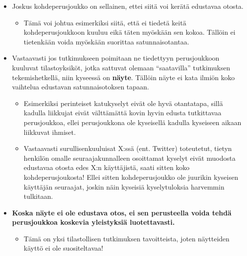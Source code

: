 \documentclass[
]{book}
\providecommand{\tightlist}{%
  \setlength{\itemsep}{0pt}\setlength{\parskip}{0pt}}
\begin{document}
\begin{itemize}
\tightlist
\item
  Joskus kohdeperusjoukko on sellainen, ettei siitä voi kerätä edustavaa otosta.

  \begin{itemize}
  \tightlist
  \item
    Tämä voi johtua esimerkiksi siitä, että ei tiedetä keitä kohdeperusjoukkoon kuuluu eikä täten myöskään sen kokoa. Tällöin ei tietenkään voida myöskään suorittaa satunnaisotantaa.
  \end{itemize}
\item
  Vastaavasti jos tutkimukseen poimitaan ne tiedettyyn perusjoukkoon kuuluvat tilastoyksiköt, jotka sattuvat olemaan ``saatavilla'' tutkimuksen tekemishetkellä, niin kyseessä on \textbf{näyte}. Tällöin näyte ei kata ilmiön koko vaihtelua edustavan satunnaisotoksen tapaan.

  \begin{itemize}
  \tightlist
  \item
    Esimerkiksi perinteiset katukyselyt eivät ole hyvä otantatapa, sillä kadulla liikkujat eivät välttämättä kovin hyvin edusta tutkittavaa perusjoukkoa, ellei perusjoukkona ole kyseisellä kadulla kyseiseen aikaan liikkuvat ihmiset.
  \item
    Vastaavasti surullisenkuuluisat X:ssä (ent. Twitter) toteutetut, tietyn henkilön omalle seuraajakunnalleen osoittamat kyselyt eivät muodosta edustavaa otosta edes X:n käyttäjistä, saati sitten koko kohdeperusjoukosta! Ellei sitten kohdeperusjoukko ole juurikin kyseisen käyttäjän seuraajat, joskin näin kyseisiä kyselytuloksia harvemmin tulkitaan.
  \end{itemize}
\item
  \textbf{Koska näyte ei ole edustava otos, ei sen perusteella voida tehdä perusjoukkoa koskevia yleistyksiä luotettavasti.}

  \begin{itemize}
  \tightlist
  \item
    Tämä on yksi tilastollisen tutkimuksen tavoitteista, joten näytteiden käyttö ei ole suositeltavaa!
  \end{itemize}
\end{itemize}
\end{document}
